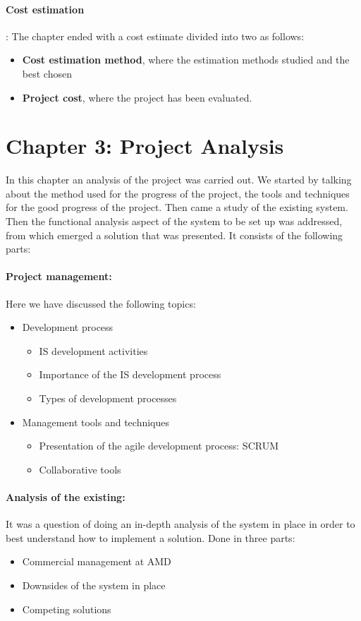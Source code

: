 \paragraph{Cost estimation}: The chapter ended with a cost estimate divided into two as follows:
\begin{itemize}
    \item \textbf{Cost estimation method}, where the estimation methods studied and the best chosen
    \item \textbf{Project cost}, where the project has been evaluated.
\end{itemize}


\section*{Chapter 3: Project Analysis}
In this chapter an analysis of the project was carried out. We started by talking about the method used for the progress of the project, the tools and techniques for the good progress of the project. Then came a study of the existing system. Then the functional analysis aspect of the system to be set up was addressed, from which emerged a solution that was presented. It consists of the following parts:
\paragraph{Project management:} Here we have discussed the following topics:
 \begin{itemize}
     \item Development process
     \begin{itemize}
         \item IS development activities
         \item Importance of the IS development process
         \item Types of development processes
     \end{itemize}
     \item Management tools and techniques
     \begin{itemize}
         \item Presentation of the agile development process: SCRUM
         \item Collaborative tools
     \end{itemize}
 \end{itemize}

\paragraph{Analysis of the existing:} It was a question of doing an in-depth analysis of the system in place in order to best understand how to implement a solution. Done in three parts:
\begin{itemize}
    \item Commercial management at AMD
    \item Downsides of the system in place
    \item Competing solutions
\end{itemize}


